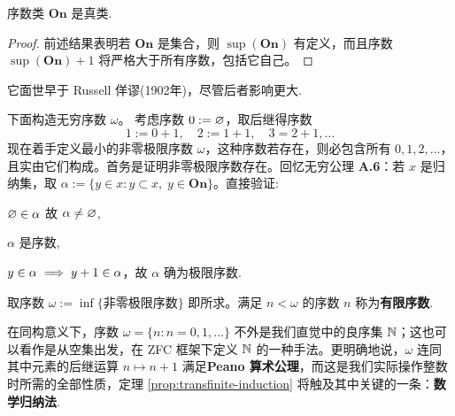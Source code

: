 \begin{proposition}\label{prop:Ord-class}
	序数类 $\mathbf{On}$ 是真类.
\end{proposition}
\begin{proof}
	前述结果表明若 $\mathbf{On}$ 是集合，则 $\sup(\mathbf{On})$ 有定义，而且序数 $\sup(\mathbf{On}) + 1$ 将严格大于所有序数，包括它自己。
\end{proof}
\begin{remark}
	它面世早于 Russell 佯谬(1902年)，尽管后者影响更大.
\end{remark}

\begin{example} 下面构造无穷序数 $\omega$。
	考虑序数 $0 := \varnothing$，取后继得序数
	\[ 1 := 0 + 1,\quad 2 := 1+1,\quad 3=2+1,\ldots \]
	现在着手定义最小的非零极限序数 $\omega$，这种序数若存在，则必包含所有 $0,1,2,\ldots$，且实由它们构成。首务是证明非零极限序数存在。回忆无穷公理 \textbf{A.6}：若 $x$ 是归纳集，取 $\alpha := \{y \in x : y \subset x,\; y \in \mathbf{On} \}$。直接验证:
	\begin{inparaenum}[(a)]
		\item $\varnothing \in \alpha$ 故 $\alpha\ne\varnothing$,
		\item $\alpha$ 是序数,
		\item $y \in \alpha \implies y + 1 \in \alpha$，故 $\alpha$ 确为极限序数.
	\end{inparaenum}
	取序数 $\omega := \inf\{ \text{非零极限序数} \}$ 即所求。满足 $n < \omega$ 的序数 $n$ 称为\textbf{有限序数}.

	在同构意义下，序数 $\omega = \{n : n=0, 1,\ldots \}$ 不外是我们直觉中的良序集 $\mathbb{N}$；这也可以看作是从空集出发，在 ZFC 框架下定义 $\mathbb{N}$ 的一种手法。更明确地说，$\omega$ 连同其中元素的后继运算 $n \mapsto n+1$ 满足\textbf{Peano 算术公理}，而这是我们实际操作整数时所需的全部性质，定理 \ref{prop:transfinite-induction} 将触及其中关键的一条：\textbf{数学归纳法}.
\end{example}

